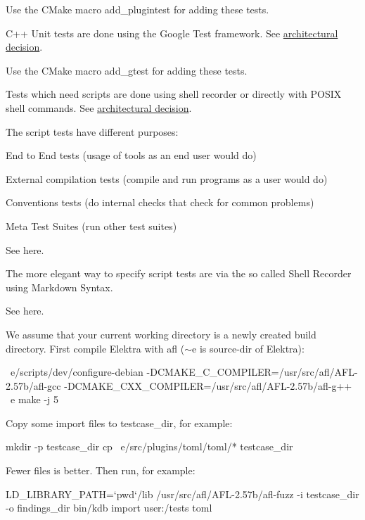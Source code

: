 Use the C\+Make macro {\ttfamily add\+\_\+plugintest} for adding these tests.

C++ Unit tests are done using the Google Test framework. See \hyperlink{doc_decisions_unit_testing_md}{architectural decision}.

Use the C\+Make macro {\ttfamily add\+\_\+gtest} for adding these tests.

Tests which need scripts are done using shell recorder or directly with P\+O\+S\+IX shell commands. See \hyperlink{doc_decisions_script_testing_md}{architectural decision}.

The script tests have different purposes\+:


\begin{DoxyItemize}
\item End to End tests (usage of tools as an end user would do)
\item External compilation tests (compile and run programs as a user would do)
\item Conventions tests (do internal checks that check for common problems)
\item Meta Test Suites (run other test suites)
\end{DoxyItemize}

See here.

The more elegant way to specify script tests are via the so called Shell Recorder using Markdown Syntax.

See here.

We assume that your current working directory is a newly created build directory. First compile Elektra with afl ($\sim$e is source-\/dir of Elektra)\+:


\begin{DoxyCode}
~e/scripts/dev/configure-debian -DCMAKE\_C\_COMPILER=/usr/src/afl/AFL-2.57b/afl-gcc
       -DCMAKE\_CXX\_COMPILER=/usr/src/afl/AFL-2.57b/afl-g++ ~e
make -j 5
\end{DoxyCode}


Copy some import files to {\ttfamily testcase\+\_\+dir}, for example\+:


\begin{DoxyCode}
mkdir -p testcase\_dir
cp ~e/src/plugins/toml/toml/* testcase\_dir
\end{DoxyCode}


Fewer files is better. Then run, for example\+:


\begin{DoxyCode}
LD\_LIBRARY\_PATH=`pwd`/lib /usr/src/afl/AFL-2.57b/afl-fuzz -i testcase\_dir -o findings\_dir bin/kdb import
       user:/tests toml
\end{DoxyCode}


